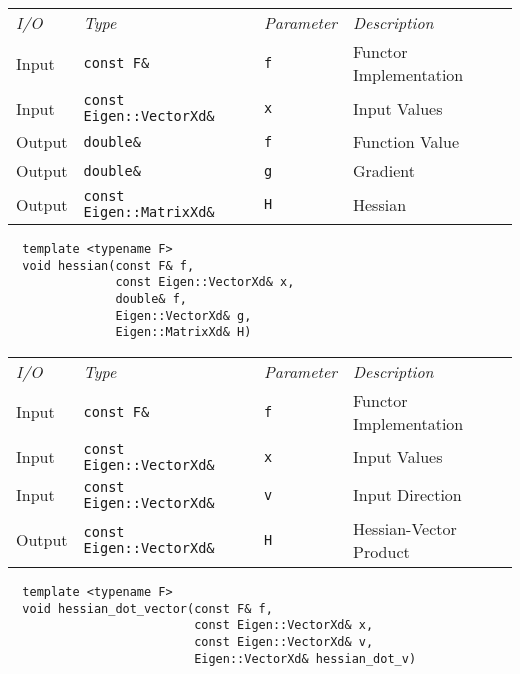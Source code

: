 \begin{tcolorbox}[colback=white,colframe=gray90, coltitle=black,boxrule=3pt,
fonttitle=\bfseries,title=Hessian]

\begin{tabular}{llll}
\textit{I/O} & \textit{Type} & \textit{Parameter} & \textit{Description} \\
Input & \texttt{const F\&} & \texttt{f} & Functor Implementation \\
Input & \texttt{const Eigen::VectorXd\&} & \texttt{x} & Input Values \\
Output & \texttt{double\&} & \texttt{f} & Function Value \\
Output & \texttt{double\&} & \texttt{g} & Gradient \\
Output & \texttt{const Eigen::MatrixXd\&} & \texttt{H} & Hessian
\end{tabular}

\vspace{5mm}

\begin{verbatim}
  template <typename F>
  void hessian(const F& f,
               const Eigen::VectorXd& x,
               double& f,
               Eigen::VectorXd& g,
               Eigen::MatrixXd& H)
\end{verbatim}

\end{tcolorbox}

\begin{tcolorbox}[colback=white,colframe=gray90, coltitle=black,boxrule=3pt,
fonttitle=\bfseries,title=Hessian-Vector Product]

\begin{tabular}{llll}
\textit{I/O} & \textit{Type} & \textit{Parameter} & \textit{Description} \\
Input & \texttt{const F\&} & \texttt{f} & Functor Implementation \\
Input & \texttt{const Eigen::VectorXd\&} & \texttt{x} & Input Values \\
Input & \texttt{const Eigen::VectorXd\&} & \texttt{v} & Input Direction \\
Output & \texttt{const Eigen::VectorXd\&} & \texttt{H} & Hessian-Vector Product
\end{tabular}

\vspace{5mm}

\begin{verbatim}
  template <typename F>
  void hessian_dot_vector(const F& f,
                          const Eigen::VectorXd& x,
                          const Eigen::VectorXd& v,
                          Eigen::VectorXd& hessian_dot_v)
\end{verbatim}

\end{tcolorbox}

